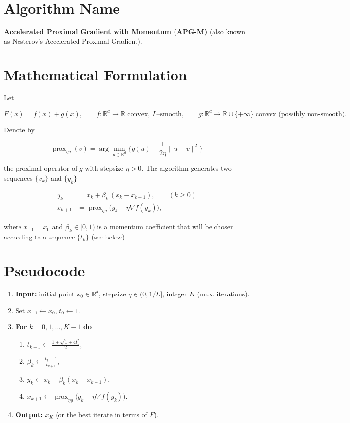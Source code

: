 \documentclass{article}
\begin{document}
\section*{Algorithm Name}
\textbf{Accelerated Proximal Gradient with Momentum (APG-M)}  
(also known as Nesterov’s Accelerated Proximal Gradient).

\section*{Mathematical Formulation}
Let  

\[
F(x)=f(x)+g(x),\qquad f:\mathbb R^{d}\to\mathbb R \text{ convex, $L$–smooth},
\qquad g:\mathbb R^{d}\to\mathbb R\cup\{+\infty\}\text{ convex (possibly non‑smooth)} .
\]

Denote by  

\[
\operatorname{prox}_{\eta g}(v)=\arg\min_{u\in\mathbb R^{d}}\Big\{ g(u)+\frac{1}{2\eta}\|u-v\|^{2}\Big\}
\]

the proximal operator of $g$ with stepsize $\eta>0$.  
The algorithm generates two sequences $\{x_{k}\}$ and $\{y_{k}\}$:

\[
\boxed{
\begin{aligned}
y_{k}      &= x_{k}+ \beta_{k}\,(x_{k}-x_{k-1}), \qquad (k\ge 0)\\[2mm]
x_{k+1} &= \operatorname{prox}_{\eta g}\!\bigl(y_{k}-\eta \nabla f(y_{k})\bigr),
\end{aligned}}
\tag{APG-M}
\]

where $x_{-1}=x_{0}$ and $\beta_{k}\in[0,1)$ is a momentum coefficient that will be
chosen according to a sequence $\{t_{k}\}$ (see below).

\section*{Pseudocode}
\begin{enumerate}[label=Step \arabic*:, leftmargin=*, align=left]
\item \textbf{Input:} initial point $x_{0}\in\mathbb R^{d}$, stepsize $\eta\in(0,1/L]$, 
      integer $K$ (max. iterations).
\item Set $x_{-1}\leftarrow x_{0}$, $t_{0}\leftarrow 1$.
\item \textbf{For} $k=0,1,\dots ,K-1$ \textbf{do}
\begin{enumerate}[label=\arabic*.]
\item $t_{k+1}\leftarrow\frac{1+\sqrt{1+4t_{k}^{2}}}{2}$,
\item $\beta_{k}\leftarrow\frac{t_{k}-1}{t_{k+1}}$,
\item $y_{k}\leftarrow x_{k}+ \beta_{k}(x_{k}-x_{k-1})$,
\item $x_{k+1}\leftarrow\operatorname{prox}_{\eta g}\!\bigl(y_{k}-\eta\nabla f(y_{k})\bigr)$.
\end{enumerate}
\item \textbf{Output:} $x_{K}$ (or the best iterate in terms of $F$).
\end{enumerate}
\end{document}
